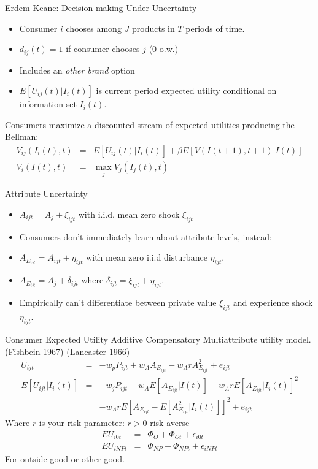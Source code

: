 \documentclass[xcolor=pdftex,dvipsnames,table,mathserif,aspectratio=169]{beamer}
\begin{document}
\begin{frame}{Erdem Keane: Decision-making Under Uncertainty}
\begin{itemize}
\item Consumer $i$ chooses among $J$ products in $T$ periods of time.
\item $d_{ij}(t)=1$ if consumer chooses $j$ (0 o.w.)
\item Includes an \textit{other brand} option
\item $E[U_{ij}(t) | I_i(t)]$ is current period expected utility conditional on information set $I_i(t)$.
\end{itemize}
Consumers maximize a discounted stream of expected utilities producing the Bellman:
\begin{eqnarray*}
V_{ij}(I_i(t),t) &=& E[U_{ij}(t) | I_i(t)] + \beta E[V(I(t+1),t+1) | I(t)] \\
V_i(I(t),t) &=& \max_j V_j(I_j(t),t)
\end{eqnarray*}
\end{frame}


\begin{frame}{Attribute Uncertainty}
\begin{itemize}
\item $A_{ijt} = A_j + \xi_{ijt} $ with i.i.d. mean zero shock $\xi_{ijt}$
\item Consumers don't immediately learn about attribute levels, instead:
\item $A_{E_{ijt}} = A_{ijt} + \eta_{ijt}$ with mean zero i.i.d disturbance $\eta_{ijt}$.
\item $A_{E_{ijt}} = A_{j} + \delta_{ijt}$ where $\delta_{ijt} = \xi_{ijt} + \eta_{ijt}$.
\item Empirically can't differentiate between private value $\xi_{ijt}$ and experience shock $\eta_{ijt}$.
\end{itemize}
\end{frame}

\begin{frame}{Consumer Expected Utility}
Additive Compensatory Multiattribute utility model. (Fishbein 1967) (Lancaster 1966)
\begin{eqnarray*}
U_{ijt} &=& -w_p P_{ijt} + w_A A_{E_{ijt}} - w_A r A_{E_{ijt}}^2 + e_{ijt}\\
E[U_{ijt} | I_i(t)] &=& -w_j P_{ijt} + w_A E[A_{E_{ijt}} | I(t)] - w_A r E [A_{E_{ijt}} | I_i(t)]^2\\
&&-w_A r E[A_{E_{ijt}} - E[A_{E_{ijt}}^2 | I_i(t)]]^2 + e_{ijt}
\end{eqnarray*}
Where $r$ is your risk parameter:  $r > 0$ risk averse
\begin{eqnarray*}
EU_{i0t}  &=& \Phi_{O} + \Phi_{Ot} + \epsilon_{i0t}\\
EU_{iNPt}  &=& \Phi_{NP} + \Phi_{NPt} + \epsilon_{iNPt}
\end{eqnarray*}
For outside good or other good.
\end{frame}
\end{document}
